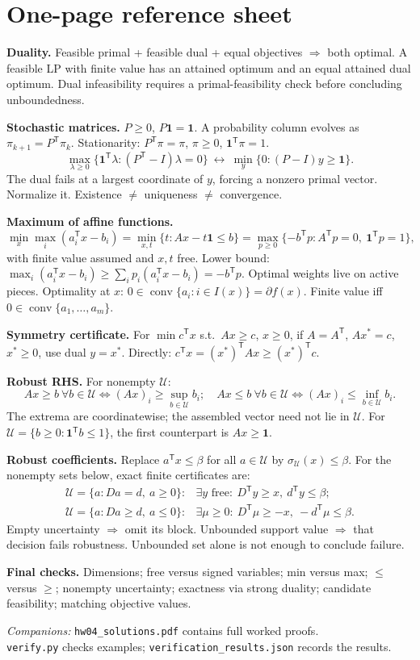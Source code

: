 \documentclass[11pt]{article}
\newcommand{\T}{^{\mathsf T}}
\newcommand{\ones}{\mathbf 1}
\newcommand{\conv}{\operatorname{conv}}
\begin{document}
\newpage
\section{One-page reference sheet}
\small
\textbf{Duality.} Feasible primal + feasible dual + equal objectives
$\Rightarrow$ both optimal. A feasible LP with finite value has an
attained optimum and an equal attained dual optimum. Dual infeasibility
requires a primal-feasibility check before concluding unboundedness.

\textbf{Stochastic matrices.}
$P\ge0$, $P\ones=\ones$. A probability column evolves as
$\pi_{k+1}=P\T\pi_k$. Stationarity:
$P\T\pi=\pi$, $\pi\ge0$, $\ones\T\pi=1$.
\[
\max_{\lambda\ge0}\{\ones\T\lambda:(P\T-I)\lambda=0\}
\ \longleftrightarrow\
\min_y\{0:(P-I)y\ge\ones\}.
\]
The dual fails at a largest coordinate of $y$, forcing a nonzero primal
vector. Normalize it. Existence $\ne$ uniqueness $\ne$ convergence.

\textbf{Maximum of affine functions.}
\[
\min_x\max_i(a_i\T x-b_i)
=\min_{x,t}\{t:Ax-t\ones\le b\}
=\max_{p\ge0}\{-b\T p:A\T p=0,\ \ones\T p=1\},
\]
with finite value assumed and $x,t$ free. Lower bound:
$\max_i(a_i\T x-b_i)\ge\sum_i p_i(a_i\T x-b_i)=-b\T p$.
Optimal weights live on active pieces. Optimality at $x$:
$0\in\conv\{a_i:i\in I(x)\}=\partial f(x)$.
Finite value iff $0\in\conv\{a_1,\ldots,a_m\}$.

\textbf{Symmetry certificate.}
For $\min c\T x$ s.t.\ $Ax\ge c$, $x\ge0$, if
$A=A\T$, $Ax^*=c$, $x^*\ge0$, use dual $y=x^*$.
Directly: $c\T x=(x^*)\T Ax\ge(x^*)\T c$.

\textbf{Robust RHS.} For nonempty $\mathcal U$:
\[
Ax\ge b\ \forall b\in\mathcal U\iff (Ax)_i\ge\sup_{b\in\mathcal U}b_i;
\quad
Ax\le b\ \forall b\in\mathcal U\iff (Ax)_i\le\inf_{b\in\mathcal U}b_i.
\]
The extrema are coordinatewise; the assembled vector need not lie in
$\mathcal U$. For $\mathcal U=\{b\ge0:\ones\T b\le1\}$, the first
counterpart is $Ax\ge\ones$.

\textbf{Robust coefficients.} Replace $a\T x\le\beta$ for all
$a\in\mathcal U$ by $\sigma_{\mathcal U}(x)\le\beta$.
For the nonempty sets below, exact finite certificates are:
\[
\begin{array}{ll}
\mathcal U=\{a:D a=d,\ a\ge0\}:&
\exists y\text{ free}:\ D\T y\ge x,\ d\T y\le\beta;\\[4pt]
\mathcal U=\{a:D a\ge d,\ a\le0\}:&
\exists\mu\ge0:\ D\T\mu\ge-x,\ -d\T\mu\le\beta.
\end{array}
\]
Empty uncertainty $\Rightarrow$ omit its block. Unbounded support value
$\Rightarrow$ that decision fails robustness. Unbounded set alone is
not enough to conclude failure.

\textbf{Final checks.} Dimensions; free versus signed variables; min
versus max; $\le$ versus $\ge$; nonempty uncertainty; exactness via strong
duality; candidate feasibility; matching objective values.

\vfill
\footnotesize\textit{Companions:} \texttt{hw04\_solutions.pdf} contains full worked proofs.\\
\texttt{verify.py} checks examples; \texttt{verification\_results.json} records the results.
\end{document}
